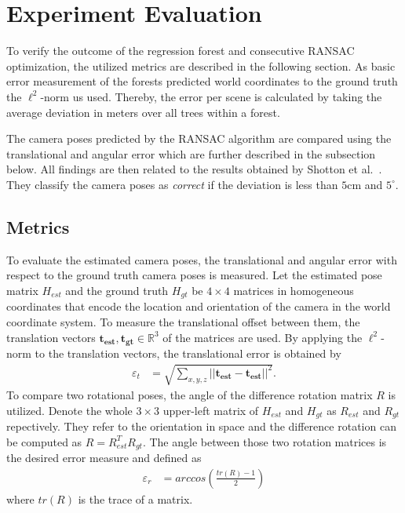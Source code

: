 \documentclass[final]{cvpr}
\begin{document}
\section{Experiment Evaluation} \label{sec:eval}
To verify the outcome of the regression forest and consecutive RANSAC optimization, the utilized metrics are described
in the following section. As basic error measurement of the forests predicted world coordinates to the ground truth the 
$\ell^2$-norm us used. Thereby, the error per scene is calculated by taking the average deviation in meters 
over all trees within a forest. 

The camera poses predicted by the RANSAC algorithm are compared using the translational and angular error 
which are further described in the subsection below. All findings are then related to the results obtained by 
Shotton et al.~\cite{shotton2013}. They classify the camera poses as \textit{correct} if the deviation is less
than $5$cm and $5^\circ$. 


\subsection{Metrics} \label{subsec:metrics}
To evaluate the estimated camera poses, the translational and angular error with respect to the 
ground truth camera poses is measured. Let the estimated pose matrix $H_{est}$ and the ground truth 
$H_{gt}$ be $4 \times 4$ matrices
in homogeneous coordinates that encode the location and orientation of the camera in the world 
coordinate system. To measure the translational offset between them, the translation vectors 
$\boldsymbol{t_{est}}, \boldsymbol{t_{gt}} \in \mathbb{R}^3$ of the matrices are used.
By applying the $\ell^2$-norm to the translation vectors, the translational error is obtained by
\begin{align}
    \varepsilon_t &= \sqrt{\sum_{x,y,z}||\boldsymbol{t_{est}} - \boldsymbol{t_{est}}||^2}.
\end{align}
To compare two rotational poses, the angle of the difference rotation matrix $R$ is utilized. 
Denote the whole $3\times3$ upper-left matrix of $H_{est}$ and $H_{gt}$ as $R_{est}$ and 
$R_{gt}$ repectively. They refer to the orientation in space and the difference rotation can be computed 
as $R = R_{est}^TR_{gt}$. The angle between those two rotation matrices is the desired
error measure and defined as
\begin{align}
    \varepsilon_r &= arccos \left( \frac{tr(R)-1}{2} \right)
\end{align}
where $tr(R)$ is the trace of a matrix.
\end{document}
